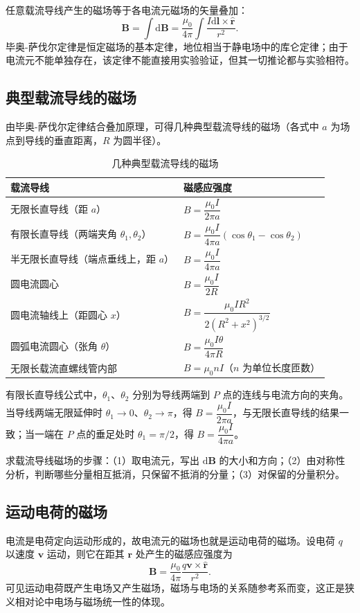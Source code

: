     任意载流导线产生的磁场等于各电流元磁场的矢量叠加：
    \[
    \boldsymbol{B}=\int\mathrm{d}\boldsymbol{B}=\frac{\mu_0}{4\pi}\int\frac{I\mathrm{d}\boldsymbol{l}\times\hat{\boldsymbol{r}}}{r^{2}}.
    \]
    毕奥-萨伐尔定律是恒定磁场的基本定律，地位相当于静电场中的库仑定律；由于电流元不能单独存在，该定律不能直接用实验验证，但其一切推论都与实验相符。

    \subsection{典型载流导线的磁场}
    由毕奥-萨伐尔定律结合叠加原理，可得几种典型载流导线的磁场（各式中 $a$ 为场点到导线的垂直距离，$R$ 为圆半径）。

    \begin{table}[htbp]
    \centering
    \caption{几种典型载流导线的磁场}
    \begin{tabular}{ll}
    \toprule
    载流导线 & 磁感应强度 \\
    \midrule
    无限长直导线（距 $a$） & $B=\dfrac{\mu_0I}{2\pi a}$ \\
    有限长直导线（两端夹角 $\theta_1,\theta_2$） & $B=\dfrac{\mu_0I}{4\pi a}(\cos\theta_1-\cos\theta_2)$ \\
    半无限长直导线（端点垂线上，距 $a$） & $B=\dfrac{\mu_0I}{4\pi a}$ \\
    圆电流圆心 & $B=\dfrac{\mu_0I}{2R}$ \\
    圆电流轴线上（距圆心 $x$） & $B=\dfrac{\mu_0IR^{2}}{2(R^{2}+x^{2})^{3/2}}$ \\
    圆弧电流圆心（张角 $\theta$） & $B=\dfrac{\mu_0I\theta}{4\pi R}$ \\
    无限长载流直螺线管内部 & $B=\mu_0nI$（$n$ 为单位长度匝数） \\
    \bottomrule
    \end{tabular}
    \end{table}

    有限长直导线公式中，$\theta_1$、$\theta_2$ 分别为导线两端到 $P$ 点的连线与电流方向的夹角。当导线两端无限延伸时 $\theta_1\to0$、$\theta_2\to\pi$，得 $B=\dfrac{\mu_0I}{2\pi a}$，与无限长直导线的结果一致；当一端在 $P$ 点的垂足处时 $\theta_1=\pi/2$，得 $B=\dfrac{\mu_0I}{4\pi a}$。

    求载流导线磁场的步骤：（1）取电流元，写出 $\mathrm{d}\boldsymbol{B}$ 的大小和方向；（2）由对称性分析，判断哪些分量相互抵消，只保留不抵消的分量；（3）对保留的分量积分。

    \subsection{运动电荷的磁场}
    电流是电荷定向运动形成的，故电流元的磁场也就是运动电荷的磁场。设电荷 $q$ 以速度 $\boldsymbol{v}$ 运动，则它在距其 $\boldsymbol{r}$ 处产生的磁感应强度为
    \[
    \boldsymbol{B}=\frac{\mu_0}{4\pi}\frac{q\boldsymbol{v}\times\hat{\boldsymbol{r}}}{r^{2}}.
    \]
    可见运动电荷既产生电场又产生磁场，磁场与电场的关系随参考系而变，这正是狭义相对论中电场与磁场统一性的体现。

